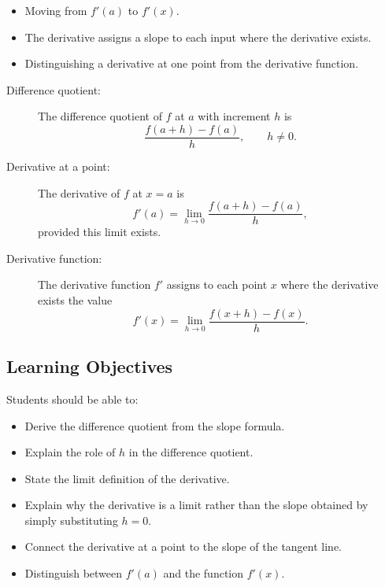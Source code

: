 \documentclass{article}
\begin{document}
\begin{itemize}
    \item Moving from $f'(a)$ to $f'(x)$.
    \item The derivative assigns a slope to each input where the derivative exists.
    \item Distinguishing a derivative at one point from the derivative function.
\end{itemize}

\begin{tcolorbox}[title=Key Definitions]
\begin{description}
    \item[Difference quotient:]
    The difference quotient of $f$ at $a$ with increment $h$ is
    \[
        \frac{f(a+h)-f(a)}{h},
        \qquad h\neq0.
    \]

    \item[Derivative at a point:]
    The derivative of $f$ at $x=a$ is
    \[
        f'(a)
        =
        \lim_{h\to0}
        \frac{f(a+h)-f(a)}{h},
    \]
    provided this limit exists.

    \item[Derivative function:]
    The derivative function $f'$ assigns to each point $x$ where the derivative exists the value
    \[
        f'(x)
        =
        \lim_{h\to0}
        \frac{f(x+h)-f(x)}{h}.
    \]
\end{description}
\end{tcolorbox}

\subsection*{Learning Objectives}

Students should be able to:

\begin{itemize}
    \item Derive the difference quotient from the slope formula.
    \item Explain the role of $h$ in the difference quotient.
    \item State the limit definition of the derivative.
    \item Explain why the derivative is a limit rather than the slope obtained by simply substituting $h=0$.
    \item Connect the derivative at a point to the slope of the tangent line.
    \item Distinguish between $f'(a)$ and the function $f'(x)$.
\end{itemize}
\end{document}
